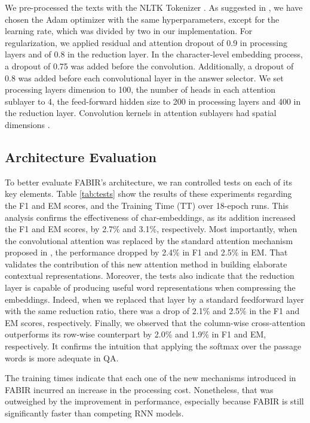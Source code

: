 \documentclass[conference, letterpaper, 10pt]{IEEEtran}
\begin{document}
We pre-processed the texts with the NLTK Tokenizer \cite{Bird2009}. As suggested in \cite{Vaswani}, we have chosen the Adam optimizer \cite{Kingma2014a} with the same hyperparameters, except for the learning rate, which was divided by two in our implementation.  For regularization, we applied residual and attention dropout \cite{Vaswani} of 0.9 in processing layers and of 0.8 in the reduction layer. In the character-level embedding process, a dropout of 0.75 was added before the convolution. Additionally, a dropout of 0.8 was added before each convolutional layer in the answer selector. We set processing layers dimension  to 100, the number of heads  in each attention sublayer to 4, the feed-forward hidden size to 200 in processing layers and 400 in the reduction layer. Convolution kernels in attention sublayers had spatial dimensions .

\subsection{Architecture Evaluation}
To better evaluate FABIR's architecture, we ran controlled tests on each of its key elements. Table \ref{tab:tests} show the results of these experiments regarding the F1 and EM scores, and the Training Time (TT) over 18-epoch runs. This analysis confirms the effectiveness of char-embeddings, as its addition increased the F1 and EM scores, by 2.7\% and 3.1\%, respectively. Most importantly, when the convolutional attention was replaced by the standard attention mechanism proposed in \cite{Vaswani}, the performance dropped by 2.4\% in F1 and 2.5\% in EM. That validates the contribution of this new attention method in building elaborate contextual representations. Moreover, the tests also indicate that the reduction layer is capable of producing useful word representations when compressing the embeddings. Indeed, when we replaced that layer by a standard feedforward layer with the same reduction ratio, there was a drop of 2.1\% and 2.5\% in the F1 and EM scores, respectively. Finally, we observed that the column-wise cross-attention outperforms its row-wise counterpart by 2.0\% and 1.9\% in F1 and EM, respectively. It confirms the intuition that applying the softmax over the passage words is more adequate in QA.

The training times indicate that each one of the new mechanisms introduced in FABIR incurred an increase in the processing cost. Nonetheless, that was outweighed by the improvement in performance, especially because FABIR is still significantly faster than competing RNN models.
\end{document}
